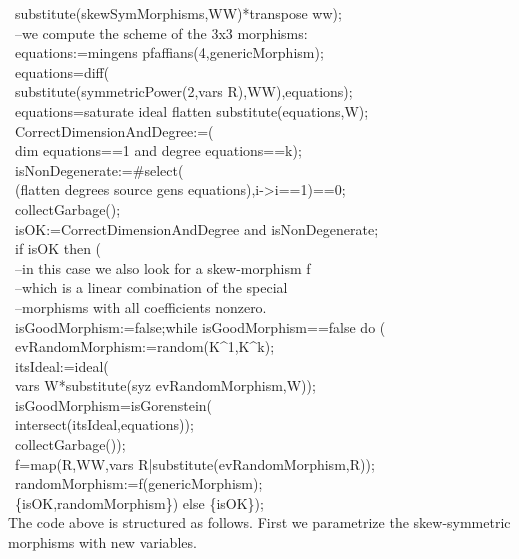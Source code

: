 \                substitute(skewSymMorphisms,WW)*transpose ww);\\
\           --we compute the scheme of the 3x3 morphisms:\\
\           equations:=mingens pfaffians(4,genericMorphism);\\
\           equations=diff(\\
\                substitute(symmetricPower(2,vars R),WW),equations);\\
\           equations=saturate ideal flatten substitute(equations,W);\\
\           CorrectDimensionAndDegree:=(\\
\                dim equations==1 and degree equations==k);\\
\           isNonDegenerate:=#select(\\
\                (flatten degrees source gens equations),i->i==1)==0;\\
\           collectGarbage();\\
\           isOK:=CorrectDimensionAndDegree and isNonDegenerate;\\
\           if isOK then (\\
\                --in this case we also look for a skew-morphism f \\
\                --which is a linear combination of the special \\
\                --morphisms with all coefficients nonzero.\\
\                isGoodMorphism:=false;while isGoodMorphism==false do (\\
\                     evRandomMorphism:=random(K^1,K^k);\\
\                     itsIdeal:=ideal(\\
\                          vars W*substitute(syz evRandomMorphism,W));\\
\                     isGoodMorphism=isGorenstein(\\
\                          intersect(itsIdeal,equations));\\
\                     collectGarbage());\\
\                f=map(R,WW,vars R|substitute(evRandomMorphism,R));\\
\                randomMorphism:=f(genericMorphism);\\
\                \{isOK,randomMorphism\}) else \{isOK\});\\
\endOutput
The code above is structured as follows. 
First we parametrize the skew-symmetric morphisms with new variables.
